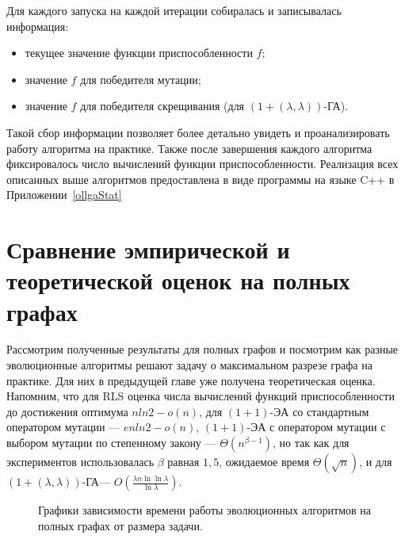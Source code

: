\documentclass[times]{itmo-student-thesis}
\newcommand{\alglambdaf}{${(1 + (\lambda , \lambda))}$-ГА\xspace}
\newcommand{\oea}{\mbox{$(1 + 1)$-ЭА}\xspace}
\begin{document}
Для каждого запуска на каждой итерации собиралась и записывалась  информация:
\begin{itemize}
 \item текущее значение функции приспособленности $f$;
 \item значение $f$ для победителя мутации;
 \item значение $f$ для победителя скрещивания (для \alglambdaf).
\end{itemize}

Такой сбор информации позволяет более детально увидеть и проанализировать работу алгоритма на практике.
Также после завершения каждого алгоритма фиксировалось число вычислений функции приспособленности.
Реализация всех описанных выше алгоритмов предоставлена в виде программы на языке C++ в Приложении~\ref{ollgaStat}

\section{Сравнение эмпирической и теоретической оценок на полных графах}

Рассмотрим полученные результаты для полных графов и посмотрим как разные эволюционные алгоритмы решают задачу о максимальном разрезе графа на практике.
Для них в предыдущей главе уже получена теоретическая оценка.
Напомним, что для RLS оценка числа вычислений функций приспособленности до достижения оптимума $nln2 - o(n)$, для \oea со стандартным оператором мутации --- $enln2 - o(n)$, \oea с оператором мутации с выбором мутации по степенному закону --- $\Theta(n^{\beta-1})$, но так как для экспериментов использовалась $\beta$ равная $1,5$, ожидаемое время $\Theta(\sqrt{n})$, и для \alglambdaf --- $O\left(\frac{\lambda n\ln \ln \lambda}{\ln \lambda}\right)$.

\begin{figure}[t!]
\caption{Графики зависимости времени работы эволюционных алгоритмов на полных графах от размера задачи.}
\label{fig:kn}
\end{figure}
\end{document}
